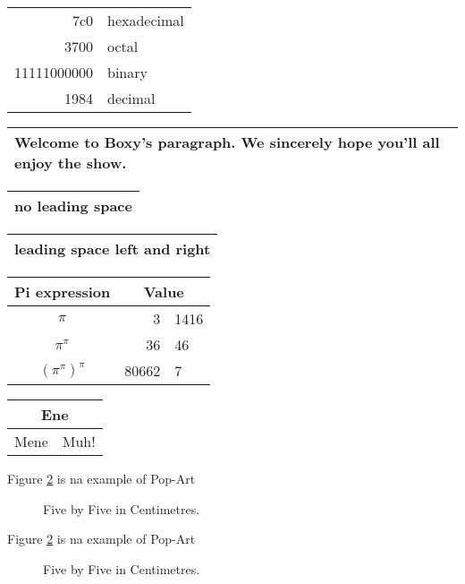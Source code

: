 \documentclass{article}
\begin{document}
\begin{tabular}{|r|l|}
  \hline
  7c0 & hexadecimal \\
  3700 & octal \\ \cline{2-2}
  11111000000 & binary \\
  \hline \hline
  1984 & decimal \\
  \hline
\end{tabular}

\begin{tabular}{|p{4.7cm}|}
  \hline
  Welcome to Boxy’s paragraph.
  We sincerely hope you’ll
  all enjoy the show.\\
  \hline
\end{tabular}

\begin{tabular}{@{} l @{}}
  \hline
  no leading space\\
  \hline
\end{tabular}

\begin{tabular}{l}
  \hline
  leading space left and right\\
  \hline
\end{tabular}
\begin{center}
\begin{tabular}{c r @{.} l}
  Pi expression &
  \multicolumn{2}{c}{Value} \\
  \hline
  $\pi$ & 3&1416 \\
  $\pi^{\pi}$ & 36&46 \\
  $(\pi^{\pi})^{\pi}$ & 80662&7 \\
\end{tabular}
\end{center}

\begin{tabular}{|c|c|}
  \hline
  \multicolumn{2}{|c|}{Ene} \\
  \hline
  Mene & Muh! \\
  \hline
\end{tabular}

Figure \ref{white} is na example of Pop-Art
\begin{figure}[!hbp]
  \makebox[\textwidth]{\framebox[5cm]{\rule{0pt}{5cm}}}
  \caption{Five by Five in Centimetres. \label{white}}
\end{figure}

Figure \ref{white} is na example of Pop-Art
\begin{figure}[!hbp]
  \makebox[\textwidth]{\framebox[5cm]{\rule{0pt}{5cm}}}
  \caption{Five by Five in Centimetres. \label{white}}
\end{figure}
\end{document}

